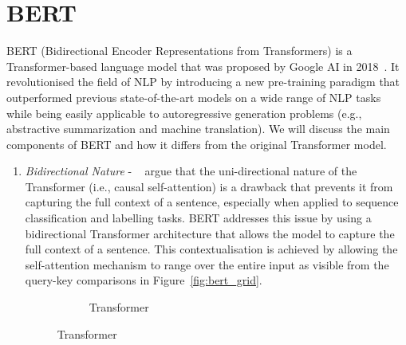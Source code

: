 \section{BERT}\label{sec:bert}
BERT (Bidirectional Encoder Representations from Transformers) is a Transformer-based language model that was proposed by Google AI in 2018~\cite{devlin-etal-2019-bert}.
It revolutionised the field of NLP by introducing a new pre-training paradigm that outperformed previous state-of-the-art models on a wide range of NLP tasks while being easily applicable to autoregressive generation problems (e.g., abstractive summarization and machine translation).
We will discuss the main components of BERT and how it differs from the original Transformer model.
\begin{enumerate}
    \item \emph{Bidirectional Nature} - ~\cite{jurafsky2000} argue that the uni-directional nature of the Transformer (i.e., causal self-attention) is a drawback that
    prevents it from capturing the full context of a sentence, especially when applied to sequence classification and labelling tasks.
    BERT addresses this issue by using a bidirectional Transformer architecture that allows the model to capture the full context of a sentence.
    This contextualisation is achieved by allowing the self-attention mechanism to range over the entire input as visible from the query-key comparisons in Figure~\ref{fig:bert_grid}.
    \begin{figure}[h]
        \centering
        \begin{subfigure}{0.45\textwidth}
            \centering
            \caption{Transformer}
            \label{fig:causal_grid}

\end{subfigure}
\end{figure}
\end{enumerate}
